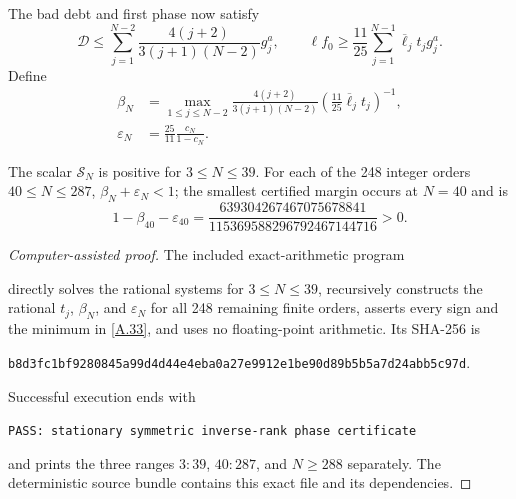 The bad debt and first phase now satisfy
\[
 \mathcal D\le\sum_{j=1}^{N-2}
 {\frac{4(j+2)}{3(j+1)(N-2)}}g_j^a,\qquad
 \ell f_0\ge{\frac{11}{25}}\sum_{j=1}^{N-1}
 \overline\ell_jt_jg_j^a.                                \tag{A.31}\label{A.31}
\]
Define
\[
\begin{aligned}
 \beta_N&=\max_{1\le j\le N-2}
 {\frac{4(j+2)}{3(j+1)(N-2)}}
 \left({\frac{11}{25}}\overline\ell_jt_j\right)^{-1},\\
 \varepsilon_N&={\frac{25}{11}}{\frac{c_N}{1-c_N}}.
\end{aligned}                                              \tag{A.32}\label{A.32}
\]
\begin{lemma}
\label{lem:symmetric-finite}
The scalar $\mathcal S_N$ is positive for $3\le N\le39$.  For each of the
248 integer orders $40\le N\le287$,
$\beta_N+\varepsilon_N<1$; the smallest certified margin occurs at $N=40$
and is
\[
1-\beta_{40}-\varepsilon_{40}
={\frac{639304267467075678841}{115369588296792467144716}}>0.  \tag{A.33}\label{A.33}
\]
\end{lemma}

\begin{proof}[Computer-assisted proof]
The included exact-arithmetic program
\begin{center}
\small{}
\end{center}
directly solves the rational systems for $3\le N\le39$, recursively constructs the rational
$t_j$, $\beta_N$, and $\varepsilon_N$ for all 248 remaining finite orders,
asserts every sign and the minimum in \eqref{A.33}, and uses no floating-point
arithmetic.  Its SHA-256 is
\begin{center}
\small\nolinkurl{b8d3fc1bf9280845a99d4d44e4eba0a27e9912e1be90d89b5b5a7d24abb5c97d}.
\end{center}
Successful execution ends with
\begin{center}
\small\texttt{PASS: stationary symmetric inverse-rank phase certificate}
\end{center}
and prints
the three ranges $3\!:\!39$, $40\!:\!287$, and $N\ge288$ separately.  The
deterministic source bundle contains this exact file and its dependencies.
\end{proof}

